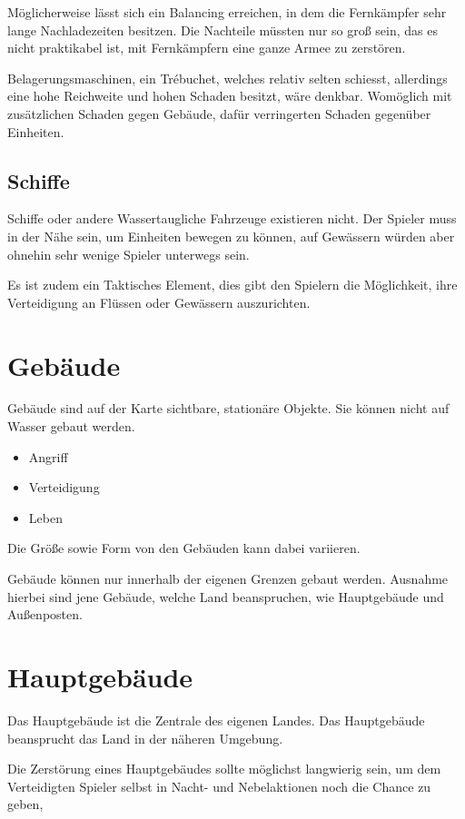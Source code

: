 Möglicherweise lässt sich ein Balancing erreichen, in dem die Fernkämpfer sehr lange Nachladezeiten besitzen. Die Nachteile müssten nur so groß sein, das es nicht praktikabel ist, mit Fernkämpfern eine ganze Armee zu zerstören.

Belagerungsmaschinen, ein Trébuchet, welches relativ selten schiesst, allerdings eine hohe Reichweite und hohen Schaden besitzt, wäre denkbar. Womöglich mit zusätzlichen Schaden gegen Gebäude, dafür verringerten Schaden gegenüber Einheiten.


\subsection{Schiffe}
Schiffe oder andere Wassertaugliche Fahrzeuge existieren nicht. Der Spieler muss in der Nähe sein, um Einheiten bewegen zu können, auf Gewässern würden aber ohnehin sehr wenige Spieler unterwegs sein.

Es ist zudem ein Taktisches Element, dies gibt den Spielern die Möglichkeit, ihre Verteidigung an Flüssen oder Gewässern auszurichten.



\section{Gebäude}
Gebäude sind auf der Karte sichtbare, stationäre Objekte. Sie können nicht auf Wasser gebaut werden.
\begin{itemize}
\item Angriff 
\item Verteidigung
\item Leben
\end{itemize}

Die Größe sowie Form von den Gebäuden kann dabei variieren.

Gebäude können nur innerhalb der eigenen Grenzen gebaut werden. Ausnahme hierbei sind jene Gebäude, welche Land beanspruchen, wie Hauptgebäude und Außenposten.


\section{Hauptgebäude}
Das Hauptgebäude ist die Zentrale des eigenen Landes. Das Hauptgebäude beansprucht das Land in der näheren Umgebung. 

Die Zerstörung eines Hauptgebäudes sollte möglichst langwierig sein, um dem Verteidigten Spieler selbst in Nacht- und Nebelaktionen noch die Chance zu geben, 

